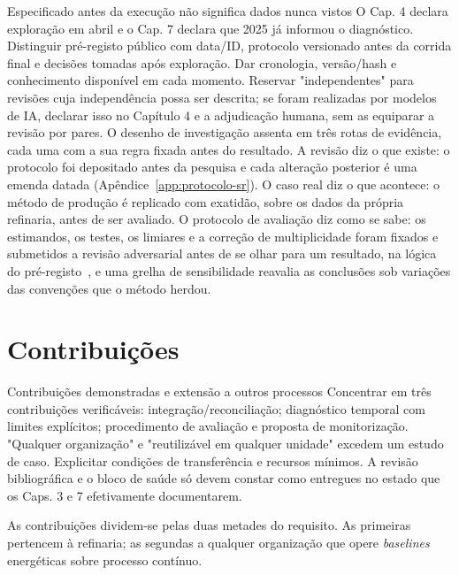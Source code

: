 {Especificado antes da execução não significa dados nunca vistos}
{O Cap. 4 declara exploração em abril e o Cap. 7 declara que 2025 já
informou o diagnóstico. Distinguir pré-registo público com data/ID,
protocolo versionado antes da corrida final e decisões tomadas após
exploração. Dar cronologia, versão/hash e conhecimento disponível em cada
momento. Reservar "independentes" para revisões cuja independência possa
ser descrita; se foram realizadas por modelos de IA, declarar isso no
Capítulo 4 e a adjudicação humana, sem as equiparar a revisão por pares.}%
O desenho de investigação assenta em três rotas de evidência, cada uma
com a sua regra fixada antes do resultado. A revisão diz o que existe:
o protocolo foi depositado antes da pesquisa e cada alteração posterior
é uma emenda datada (Apêndice~\ref{app:protocolo-sr}). O caso real diz o
que acontece: o método de produção é replicado com exatidão, sobre os
dados da própria refinaria, antes de ser avaliado. O protocolo de
avaliação diz como se sabe: os estimandos, os testes, os limiares e a
correção de multiplicidade foram fixados e submetidos a revisão
adversarial antes de se olhar para um resultado, na lógica do
pré-registo~\cite{Nosek2018},
e uma grelha de sensibilidade reavalia as conclusões sob variações das
convenções que o método herdou.

\section{Contribuições}
\label{sec:contribuicoes}
{Contribuições demonstradas e extensão a outros processos}
{Concentrar em três contribuições verificáveis: integração/reconciliação;
diagnóstico temporal com limites explícitos; procedimento de avaliação e
proposta de monitorização. "Qualquer organização" e "reutilizável em
qualquer unidade" excedem um estudo de caso. Explicitar condições de
transferência e recursos mínimos. A revisão bibliográfica e o bloco de
saúde só devem constar como entregues no estado que os Caps. 3 e 7
efetivamente documentarem.}%

As contribuições dividem-se pelas duas metades do requisito. As
primeiras pertencem à refinaria; as segundas a qualquer organização que
opere \emph{baselines} energéticas sobre processo contínuo.

